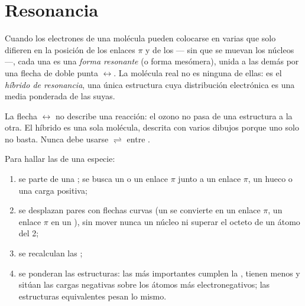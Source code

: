 \section{Resonancia}

\begin{definition}\label{def:b1:lewis-resonance-vsepr:resonance}
Cuando los electrones de una molécula pueden colocarse en varias
 que solo difieren en la posición de los enlaces
$\pi$ y de los  --- sin que se muevan los núcleos ---,
cada una es una \emph{forma resonante} (o forma
mesómera), unida a las demás por una flecha de doble punta
$\leftrightarrow$. La molécula real no es ninguna de ellas: es el
\emph{híbrido de resonancia}, una única estructura
cuya distribución electrónica es una media ponderada de las suyas.
\end{definition}

\begin{remark}\label{rem:b1:lewis-resonance-vsepr:arrow}
La flecha $\leftrightarrow$ no describe una reacción: el ozono no pasa de
una estructura a la otra. El híbrido es una sola molécula, descrita con
varios dibujos porque uno solo no basta. Nunca debe usarse
$\rightleftharpoons$ entre .
\end{remark}

\begin{method}\label{met:b1:lewis-resonance-vsepr:resonance}
Para hallar las  de una especie:
\begin{enumerate}
  \item se parte de una ; se busca un  o un enlace $\pi$ junto a un enlace $\pi$, un hueco o
        una carga positiva;
  \item se desplazan pares con flechas curvas (un  se
        convierte en un enlace $\pi$, un enlace $\pi$ en un ), sin mover nunca un núcleo ni superar el octeto de un
        átomo del  2;
  \item se recalculan las ;
  \item se ponderan las estructuras: las más importantes cumplen la , tienen menos  y sitúan las cargas
        negativas sobre los átomos más electronegativos; las estructuras
        equivalentes pesan lo mismo.
\end{enumerate}
\end{method}

